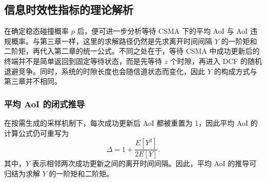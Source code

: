 \subsection{信息时效性指标的理论解析}

在确定稳态碰撞概率 $p$ 后，便可进一步分析等待 CSMA 下的平均 AoI 与 AoI 违规概率。与第三章一样，这里的求解路径仍然是先求离开时间间隔 $Y$ 的一阶矩和二阶矩，再代入第二章的统一公式。不同之处在于，等待 CSMA 中成功更新后的终端并不是简单返回到固定等待状态，而是先等待 $z$ 个时隙，再进入 DCF 的随机退避竞争。同时，系统的时隙长度也会随信道状态而变化，因此 $Y$ 的构成方式与第三章并不相同。

\subsubsection{平均 AoI 的闭式推导}

在按需生成的采样机制下，每次成功更新后 AoI 都被重置为 1，因此平均 AoI 的计算公式仍可重写为
\begin{equation}\label{cp4_avg_aoi}
    \Delta = 1 + \frac{E[Y^2]}{2E[Y]}.
\end{equation}
其中，$Y$ 表示相邻两次成功更新之间的离开时间间隔。因此，平均 AoI 的推导可归结为求解 $Y$ 的一阶矩和二阶矩。

